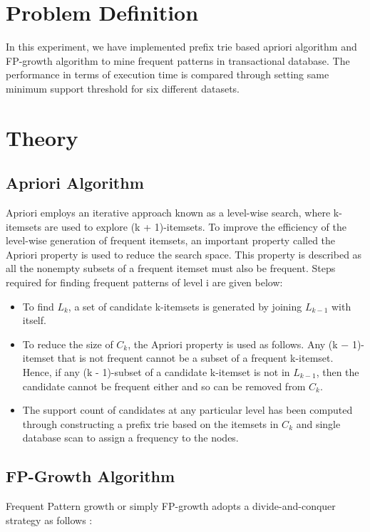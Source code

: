 \documentclass[12pt]{article}
\begin{document}
\maketitle
\thispagestyle{empty}
\clearpage
\newpage

\section{Problem Definition}
In this experiment, we have implemented prefix trie based apriori algorithm and FP-growth algorithm to mine frequent patterns in transactional database. The performance in terms of execution time is compared through setting same minimum support threshold for six different datasets.


\section{Theory}

\subsection{Apriori Algorithm}
Apriori employs an iterative approach known as a level-wise search, where k-itemsets are used to explore (k + 1)-itemsets. To improve the efficiency of the level-wise generation of frequent itemsets, an important property called the Apriori property is used to reduce the search space. This property is described as all the nonempty subsets of a frequent itemset must also be frequent. Steps required for finding frequent patterns of level i are given below:
\begin{itemize}
	\item To find $L_k$, a set of candidate k-itemsets is generated by joining $L_{k-1}$ with itself.
	\item To reduce the size of $C_k$, the Apriori property is used as follows. Any (k − 1)-itemset that is not frequent cannot be a subset of a frequent k-itemset. Hence, if any (k - 1)-subset of a candidate k-itemset is not in $ L_{k-1} $, then the candidate cannot be frequent either and so can be removed from $ C_k $.
	\item The support count of candidates at any particular level has been computed through constructing a prefix trie based on the itemsets in $ C_k $ and single database scan to assign a frequency to the nodes. 
	
\end{itemize}

\subsection{FP-Growth Algorithm}
Frequent Pattern growth or simply FP-growth adopts a divide-and-conquer strategy as follows :
\end{document}
